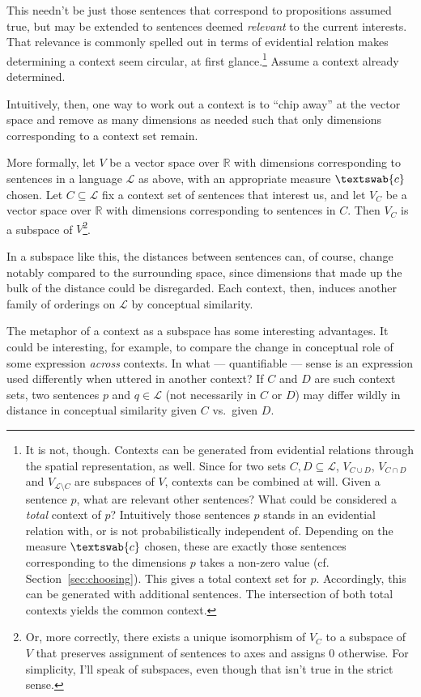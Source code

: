 \documentclass[11pt, a4paper]{scrartcl}
\renewcommand{\i}[1]{\emph{#1}}
\renewcommand{\L}{\mathcal{L}}
\newcommand{\m}[1]{\textswab{#1}}
\begin{document}
This needn't be just those sentences that correspond to propositions assumed true, but may be extended to sentences deemed \i{relevant} to the current interests. That relevance is commonly spelled out in terms of evidential relation makes determining a context seem circular, at first glance.\footnote{It is not, though. Contexts can be generated from evidential relations through the spatial representation, as well. Since for two sets $C, D \subseteq \L$, $V_{C\cup D}$, $V_{C\cap D}$ and $V_{\L\setminus C}$ are subspaces of $V$, contexts can be combined at will. Given a sentence $p$, what are relevant other sentences? What could be considered a \i{total} context of $p$? Intuitively those sentences $p$ stands in an evidential relation with, or is not probabilistically independent of. Depending on the measure $\m{c}$ chosen, these are exactly those sentences corresponding to the dimensions $p$ takes a non-zero value (cf. Section~\ref{sec:choosing}). This gives a total context set for $p$. Accordingly, this can be generated with additional sentences. The intersection of both total contexts yields the common context.} Assume a context already determined.

Intuitively, then, one way to work out a context is to ``chip away'' at the vector space and remove as many dimensions as needed such that only dimensions corresponding to a context set remain.

More formally, let $V$ be a vector space over $\mathbb{R}$ with dimensions corresponding to sentences in a language $\L$ as above, with an appropriate measure $\m{c}$ chosen. Let $C \subseteq \L$ fix a context set of sentences that interest us, and let $V_C$ be a vector space over $\mathbb{R}$ with dimensions corresponding to sentences in $C$. Then $V_C$ is a subspace of $V$\footnote{Or, more correctly, there exists a unique isomorphism of $V_C$ to a subspace of $V$ that preserves assignment of sentences to axes and assigns 0 otherwise. For simplicity, I'll speak of subspaces, even though that isn't true in the strict sense.}.

In a subspace like this, the distances between sentences can, of course, change notably compared to the surrounding space, since dimensions that made up the bulk of the distance could be disregarded. Each context, then, induces another family of orderings on $\L$ by conceptual similarity.

The metaphor of a context as a subspace has some interesting advantages. It could be interesting, for example, to compare the change in conceptual role of some expression \i{across} contexts. In what --- quantifiable --- sense is an expression used differently when uttered in another context? If $C$ and $D$ are such context sets, two sentences $p$ and $q \in \L$  (not necessarily in $C$ or $D$) may differ wildly in distance in conceptual similarity given $C$ vs.\ given $D$. 
\end{document}
